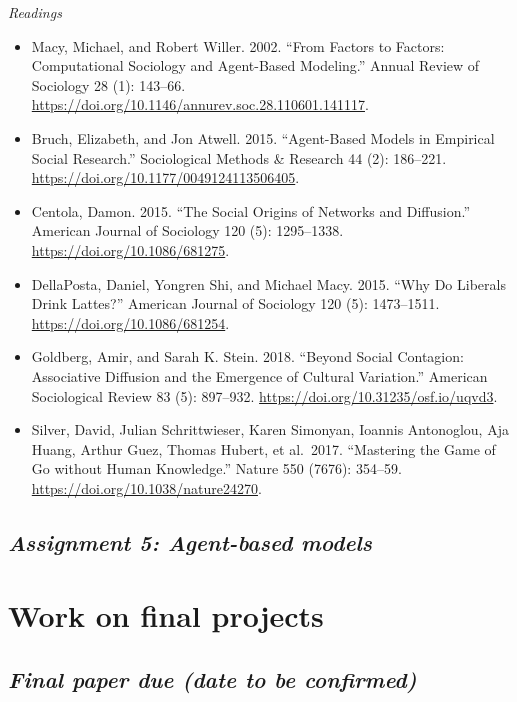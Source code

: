 \documentclass[
  10pt,
]{article}
\providecommand{\tightlist}{%
  \setlength{\itemsep}{0pt}\setlength{\parskip}{0pt}}
\begin{document}
\emph{Readings}

\begin{itemize}
\tightlist
\item
  Macy, Michael, and Robert Willer. 2002. ``From Factors to Factors:
  Computational Sociology and Agent-Based Modeling.'' Annual Review of
  Sociology 28 (1): 143--66.
  \url{https://doi.org/10.1146/annurev.soc.28.110601.141117}.
\item
  Bruch, Elizabeth, and Jon Atwell. 2015. ``Agent-Based Models in
  Empirical Social Research.'' Sociological Methods \& Research 44 (2):
  186--221. \url{https://doi.org/10.1177/0049124113506405}.
\item
  Centola, Damon. 2015. ``The Social Origins of Networks and
  Diffusion.'' American Journal of Sociology 120 (5): 1295--1338.
  \url{https://doi.org/10.1086/681275}.
\item
  DellaPosta, Daniel, Yongren Shi, and Michael Macy. 2015. ``Why Do
  Liberals Drink Lattes?'' American Journal of Sociology 120 (5):
  1473--1511. \url{https://doi.org/10.1086/681254}.
\item
  Goldberg, Amir, and Sarah K. Stein. 2018. ``Beyond Social Contagion:
  Associative Diffusion and the Emergence of Cultural Variation.''
  American Sociological Review 83 (5): 897--932.
  \url{https://doi.org/10.31235/osf.io/uqvd3}.
\item
  Silver, David, Julian Schrittwieser, Karen Simonyan, Ioannis
  Antonoglou, Aja Huang, Arthur Guez, Thomas Hubert, et al.~2017.
  ``Mastering the Game of Go without Human Knowledge.'' Nature 550
  (7676): 354--59. \url{https://doi.org/10.1038/nature24270}.
\end{itemize}

\hypertarget{assignment-5-agent-based-models}{%
\subsection{\texorpdfstring{\emph{Assignment 5: Agent-based
models}}{Assignment 5: Agent-based models}}\label{assignment-5-agent-based-models}}

\hypertarget{work-on-final-projects}{%
\section{Work on final projects}\label{work-on-final-projects}}

\hypertarget{final-paper-due-date-to-be-confirmed}{%
\subsection{\texorpdfstring{\emph{Final paper due (date to be
confirmed)}}{Final paper due (date to be confirmed)}}\label{final-paper-due-date-to-be-confirmed}}
\end{document}
